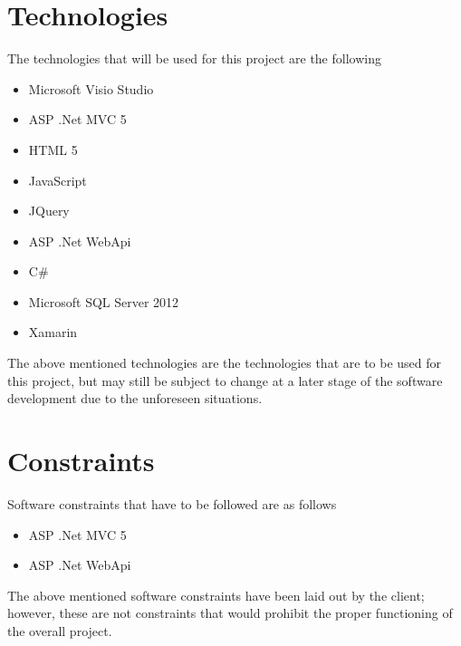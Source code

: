 \documentclass[11pt,titlepage]{article} %
\begin{document}
\section{Technologies}
The technologies that will be used  for this project are the following
\begin{itemize}
	\item{Microsoft Visio Studio}
	\item{ASP .Net MVC 5}
	\item{HTML 5}
	\item{JavaScript}
	\item{JQuery}
	\item{ASP .Net WebApi}
	\item{C\#}
	\item{Microsoft SQL Server 2012}
	\item{Xamarin}
	\end{itemize}
The above mentioned technologies are the technologies that are to be used for this project, but may still be subject to change at a later stage of the software development due to the unforeseen situations. 


\section{Constraints}
Software constraints that have to be followed are as follows
\begin{itemize}
	\item{ASP .Net MVC 5}
	\item{ASP .Net WebApi}
\end{itemize}
The above mentioned software constraints have been laid out by the client; however, these are not constraints that would prohibit the proper functioning of the overall project.
\end{document}
